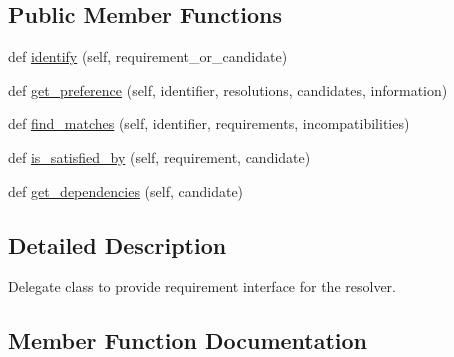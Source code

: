 \subsection*{Public Member Functions}
\begin{DoxyCompactItemize}
\item 
def \hyperlink{classpip_1_1__vendor_1_1resolvelib_1_1providers_1_1AbstractProvider_ab1fee658c7bf9eccba82775976d60b00}{identify} (self, requirement\+\_\+or\+\_\+candidate)
\item 
def \hyperlink{classpip_1_1__vendor_1_1resolvelib_1_1providers_1_1AbstractProvider_a9247b254e4505ec66b2b164ab26ba94b}{get\+\_\+preference} (self, identifier, resolutions, candidates, information)
\item 
def \hyperlink{classpip_1_1__vendor_1_1resolvelib_1_1providers_1_1AbstractProvider_af60b475a2374cb795f72ff88c09e51f9}{find\+\_\+matches} (self, identifier, requirements, incompatibilities)
\item 
def \hyperlink{classpip_1_1__vendor_1_1resolvelib_1_1providers_1_1AbstractProvider_aaf6d9dda33c45438d6dcd50cf7aabf97}{is\+\_\+satisfied\+\_\+by} (self, requirement, candidate)
\item 
def \hyperlink{classpip_1_1__vendor_1_1resolvelib_1_1providers_1_1AbstractProvider_aaa369cd95ed63b6dde6b6babaa5a4b95}{get\+\_\+dependencies} (self, candidate)
\end{DoxyCompactItemize}


\subsection{Detailed Description}
\begin{DoxyVerb}Delegate class to provide requirement interface for the resolver.\end{DoxyVerb}
 

\subsection{Member Function Documentation}
\mbox{\label{classpip_1_1__vendor_1_1resolvelib_1_1providers_1_1AbstractProvider_af60b475a2374cb795f72ff88c09e51f9}} 
